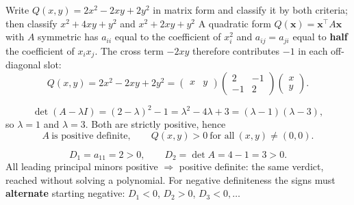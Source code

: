 \begin{worked}{Write $Q(x,y)=2x^{2}-2xy+2y^{2}$ in matrix form and classify it by both criteria; then classify $x^{2}+4xy+y^{2}$ and $x^{2}+2xy+y^{2}$}
A quadratic form $Q(\mathbf x)=\mathbf x^{\!\top}A\mathbf x$ with $A$
symmetric has $a_{ii}$ equal to the coefficient of $x_{i}^{2}$ and
$a_{ij}=a_{ji}$ equal to \textbf{half} the coefficient of $x_{i}x_{j}$. The
cross term $-2xy$ therefore contributes $-1$ in each off-diagonal slot:
\[
  Q(x,y)=2x^{2}-2xy+2y^{2}
  =\begin{pmatrix}x&y\end{pmatrix}
   \begin{pmatrix}2&-1\\-1&2\end{pmatrix}
   \begin{pmatrix}x\\y\end{pmatrix}.
\]

\[
  \det(A-\lambda I)=(2-\lambda)^{2}-1=\lambda^{2}-4\lambda+3=(\lambda-1)(\lambda-3),
\]
so $\lambda=1$ and $\lambda=3$. Both are strictly positive, hence
\[
  \boxed{A\ \text{is positive definite},\qquad Q(x,y)>0\ \text{for all}\ (x,y)\neq(0,0).}
\]

\[
  D_{1}=a_{11}=2>0,
  \qquad
  D_{2}=\det A=4-1=3>0 .
\]
All leading principal minors positive $\Rightarrow$ positive definite:
the same verdict, reached without solving a polynomial. For negative
definiteness the signs must \textbf{alternate} starting negative:
$D_{1}<0$, $D_{2}>0$, $D_{3}<0,\dots$


\end{worked}
